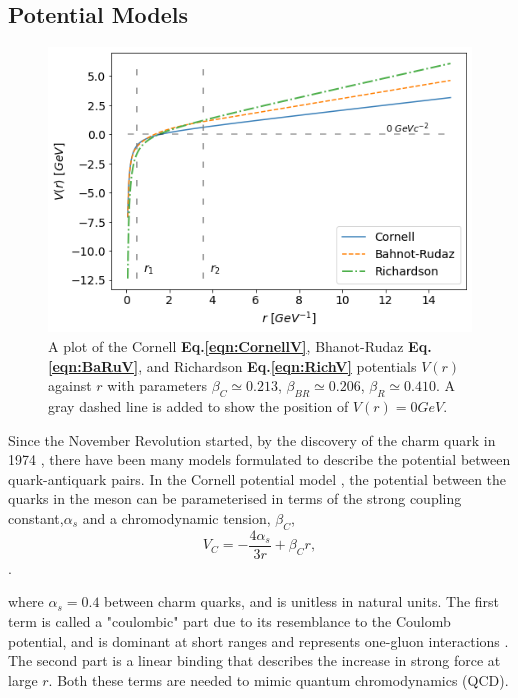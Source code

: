 \documentclass[10pt,twocolumn]{revtex4}    %
\begin{document}
\subsection{Potential Models}\label{ssec:PotModels}

\begin{figure}[t]
    \centering
    \includegraphics[width=\linewidth]{PotPlot.png}
    \caption{A plot of the Cornell \textbf{Eq.\ref{eqn:CornellV}}, Bhanot-Rudaz \textbf{Eq.\ref{eqn:BaRuV}}, and Richardson \textbf{Eq.\ref{eqn:RichV}} potentials $V(r)$ against $r$ with parameters $\beta_C \simeq 0.213$, $\beta_{BR} \simeq 0.206$, $\beta_R \simeq 0.410$. A gray dashed line is added to show the position of $V(r) = 0GeV$.}
    \label{fig:potPlot}
\end{figure}

Since the November Revolution started, by the discovery of the charm quark in 1974 \textbf{\cite{DiscoveryQuarks}}, there have been many models formulated to describe the potential between quark-antiquark pairs.
In the Cornell potential model \textbf{\cite{CornellPaper}}, the potential between the quarks in the meson can be parameterised in terms of the strong coupling constant,$\alpha_s$ and a chromodynamic tension, $\beta_{C}$,
\begin{equation}\label{eqn:CornellV}
    V_{C} = - \frac{4\alpha_s}{3r} + \beta_{C}r,
\end{equation}.

where $\alpha_s = 0.4$ between charm quarks, and is unitless in natural units. The first term is called a "coulombic" part due to its resemblance to the Coulomb potential, and is dominant at short ranges and represents one-gluon interactions \textbf{\cite{ColoumbonicValidPaper}}. The second part is a linear binding that describes the increase in strong force at large $r$. Both these terms are needed to mimic quantum chromodynamics (QCD).
\end{document}

